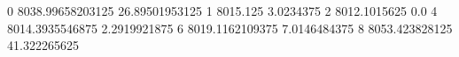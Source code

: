 0 8038.99658203125 26.89501953125
1 8015.125 3.0234375
2 8012.1015625 0.0
4 8014.3935546875 2.2919921875
6 8019.1162109375 7.0146484375
8 8053.423828125 41.322265625
